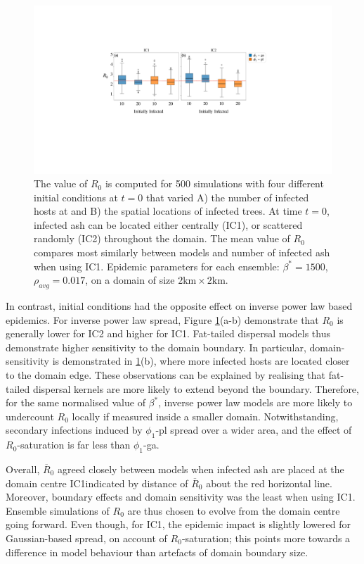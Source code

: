 \begin{figure}
    \centering
    \includegraphics[scale=0.45]{chapter6/figures/fig5-IC.pdf}
    \caption{The value of $R_0$ is computed for 500 simulations with four different initial conditions at $t=0$ that varied A) the number of infected hosts at and B) the spatial locations of infected trees. 
    At time $t=0$, infected ash can be located either centrally (IC1), or scattered randomly (IC2) throughout the domain.
    The mean value of $R_0$ compares most similarly between models and number of infected ash when using IC1.
    Epidemic parameters for each ensemble: $\beta^*=1500$, $\rho_{avg}=0.017$, on a domain of size $\mathrm{2km\times 2km}$.}
    \label{fig:seir-ash-IC}
\end{figure}

In contrast, initial conditions had the opposite effect on inverse power law based epidemics.
For inverse power law spread, Figure \ref{fig:seir-ash-IC}(a-b) demonstrate that $R_0$ is generally lower for IC2 and higher for IC1.
Fat-tailed dispersal models thus demonstrate higher sensitivity to the domain boundary.
In particular, domain-sensitivity is demonstrated in \ref{fig:seir-ash-IC}(b), where more infected hosts are located closer to the domain edge.
These observations can be explained by realising that fat-tailed dispersal kernels are more likely to extend beyond the boundary.
Therefore, for the same normalised value of $\beta^*$, inverse power law models are more likely to undercount $R_0$ locally if measured inside a smaller domain.
Notwithstanding, secondary infections induced by $\phi_1$-pl spread over a wider area, and the effect of $R_0$-saturation is far less than $\phi_1$-ga.

Overall, $\overline{R}_0$ agreed closely between models when infected ash are placed at the domain centre IC1\textemdash indicated by distance of $\overline{R}_0$ about the red horizontal line.
Moreover, boundary effects and domain sensitivity was the least when using IC1.
Ensemble simulations of $R_0$ are thus chosen to evolve from the domain centre going forward.
Even though, for IC1, the epidemic impact is slightly lowered for Gaussian-based spread, on account of $R_0$-saturation; 
this points more towards a difference in model behaviour than artefacts of domain boundary size.


